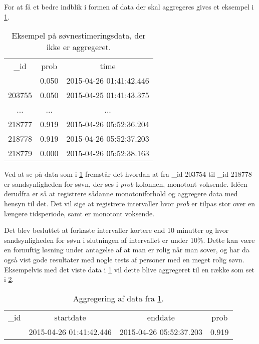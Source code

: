 For at få et bedre indblik i formen af data der skal aggregeres gives et eksempel i \cref{tab:noaggsoevndata}.
\begin{table}[h]
	\centering
\begin{tabular}{|c|c|c|}
	\hline {\_}id & prob & time \\ 
	\thickhline 203754 & 0.050 & 2015-04-26 01:41:42.446 \\ 
	\hline 203755 & 0.050 & 2015-04-25 01:41:43.375 \\ 
	\hline ... & ... & ... \\ 
	\hline 218777 & 0.919 & 2015-04-26 05:52:36.204 \\ 
	\hline 218778 & 0.919 & 2015-04-26 05:52:37.203 \\ 
	\hline 218779 & 0.000 & 2015-04-26 05:52:38.163 \\ 
	\hline 
\end{tabular}
\caption{Eksempel på søvnestimeringsdata, der ikke er aggregeret.}\label{tab:noaggsoevndata}
\end{table}
Ved at se på data som i \cref{tab:noaggsoevndata} fremstår det hvordan at fra {\_}id 203754 til {\_}id 218778 er sandsynligheden for søvn, der ses i \textit{prob} kolonnen, monotont voksende.
Idéen derudfra er så at registrere sådanne monotoniforhold og aggregere data med hensyn til det.
Det vil sige at registrere intervaller hvor \textit{prob} er tilpas stor over en længere tidsperiode, samt er monotont voksende.

Det blev besluttet at forkaste intervaller kortere end 10 minutter og hvor sandsynligheden for søvn i slutningen af intervallet er under 10\%.
Dette kan være en fornuftig løsning under antagelse af at man er rolig når man sover, og har da også vist gode resultater med nogle tests af personer med en meget rolig søvn. 
Eksempelvis med det viste data i \cref{tab:noaggsoevndata} vil dette blive aggregeret til en række som set i \cref{tab:aggdat}.

\begin{table}[h]
	\centering
\begin{tabular}{|c|c|c|c|}
	\hline {\_}id & startdate & enddate & prob \\ 
	\thickhline 1 & 2015-04-26 01:41:42.446 &  2015-04-26 05:52:37.203 & 0.919 \\ 
	\hline 
\end{tabular} 
\caption{Aggregering af data fra \cref{tab:noaggsoevndata}.}\label{tab:aggdat}
\end{table}

